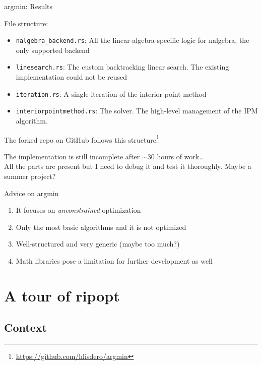\documentclass{beamer}
\begin{document}
\begin{frame}{argmin: Results}

  File structure:

  \begin{itemize}
    \item \texttt{nalgebra\_backend.rs}: All the linear-algebra-specific logic for nalgebra, the only supported backend
    \item \texttt{linesearch.rs}: The custom backtracking linear search. The existing implementation could not be reused
    \item \texttt{iteration.rs}: A single iteration of the interior-point method
    \item \texttt{interiorpointmethod.rs}: The solver. The high-level management of the IPM algorithm.
  \end{itemize}

  \vfill
  The forked repo on GitHub follows this structure\footnote{\tiny \url{https://github.com/hlisdero/argmin}}

  \vfill
  The implementation is still incomplete after $\sim$30 hours of work\dots \\
  All the parts are present but I need to debug it and test it thoroughly. Maybe a summer project?

\end{frame}

\begin{frame}{Advice on argmin}

  \begin{enumerate}
    \item It focuses on \emph{unconstrained} optimization
    \item Only the most basic algorithms and it is not optimized
    \item Well-structured and very generic (maybe too much?)
    \item Math libraries pose a limitation for further development as well
  \end{enumerate}

\end{frame}

\section{A tour of ripopt}

\subsection{Context}
\end{document}
